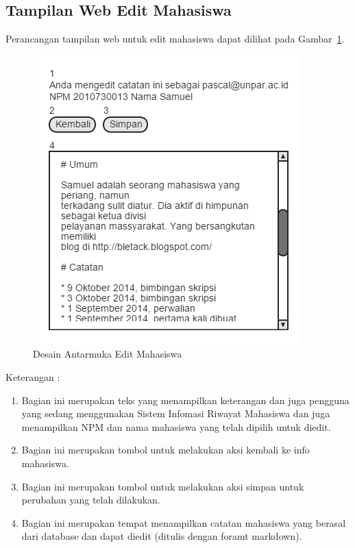 \subsection{Tampilan Web Edit Mahasiswa}
Perancangan tampilan web untuk edit mahasiswa dapat dilihat pada Gambar~\ref{fig:editmahasiswa}.
\begin{figure}[H]
\centering
\includegraphics[scale=0.5]{Gambar/editmahasiswa.png}
\caption[Desain Antarmuka Edit Mahasiswa]{Desain Antarmuka Edit Mahasiswa}
\label{fig:editmahasiswa}
\end{figure}

Keterangan :
\begin{enumerate}[(1)]
\item
Bagian ini merupakan teks yang menampilkan keterangan dan juga pengguna yang sedang menggunakan Sistem Infomasi Riwayat Mahasiswa dan juga menampilkan NPM dan nama mahasiswa yang telah dipilih untuk diedit.
\item
Bagian ini merupakan tombol untuk melakukan aksi kembali ke info mahasiswa.
\item
Bagian ini merupakan tombol untuk melakukan aksi simpan untuk perubahan yang telah dilakukan.
\item
Bagian ini merupakan tempat menampilkan catatan mahasiswa yang berasal dari database dan dapat diedit (ditulis dengan foramt markdown).
\end{enumerate}


